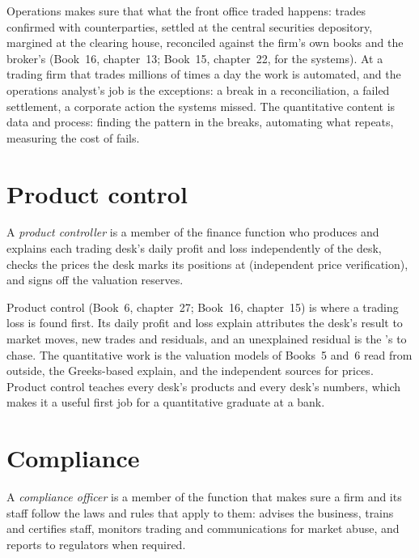 Operations makes sure that what the front office traded happens: trades confirmed with counterparties, settled at the
central securities depository, margined at the clearing house, reconciled against the firm's own books and the broker's
(Book~16, chapter~13; Book~15, chapter~22, for the systems). At a trading firm that trades millions of times a day the
work is automated, and the operations analyst's job is the exceptions: a break in a reconciliation, a failed settlement, a
corporate action the systems missed. The quantitative content is data and process: finding the pattern in the breaks,
automating what repeats, measuring the cost of fails.

\section{Product control}

\begin{definition}\label{def:in:risk-operations-product-control-and-compliance:controller}
A \emph{product controller} is a member of the finance function who produces and explains
each trading desk's daily profit and loss independently of the desk, checks the prices the desk marks its positions at
(independent price verification), and signs off the valuation reserves.
\end{definition}

Product control (Book~6, chapter~27; Book~16, chapter~15) is where a trading loss is found first. Its daily profit and
loss explain attributes the desk's result to market moves, new trades and residuals, and an unexplained residual is the
's to chase. The quantitative work is the valuation models of Books~5 and~6 read from outside, the
Greeks-based explain, and the independent sources for prices. Product control teaches every desk's products and every
desk's numbers, which makes it a useful first job for a quantitative graduate at a bank.

\section{Compliance}

\begin{definition}\label{def:in:risk-operations-product-control-and-compliance:compliance}
A \emph{compliance officer} is a member of the function that makes sure a firm and its staff
follow the laws and rules that apply to them: advises the business, trains and certifies staff, monitors trading and
communications for market abuse, and reports to regulators when required.
\end{definition}

